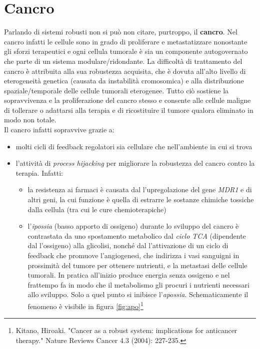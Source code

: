 \documentclass[a4paper,12pt, oneside]{book}
\begin{document}
\section{Cancro}
Parlando di sistemi robusti non si può non citare, purtroppo, il
\textbf{cancro}. Nel cancro infatti le cellule sono in grado di proliferare e
metastatizzare nonostante gli sforzi terapeutici e ogni cellula tumorale
è sia un componente autogovernato che parte di un sistema
modulare/ridondante. La difficoltà di trattamento del cancro è attribuita alla
sua robustezza acquisita, che è dovuta all'alto livello di eterogeneità genetica
(causata da instabilità cromosomica) e alla distribuzione spaziale/temporale
delle cellule tumorali eterogenee. Tutto ciò sostiene la sopravvivenza e la
proliferazione del cancro stesso e consente alle cellule maligne di tollerare o
adattarsi alla terapia e di ricostituire il tumore qualora eliminato in modo non
totale. \\
Il cancro infatti sopravvive grazie a:
\begin{itemize}
  \item molti cicli di feedback regolatori sia cellulare che nell'ambiente in
  cui si trova
  \item l'attività di \textit{process hijacking} per migliorare la robustezza
  del cancro contro la terapia. Infatti:
  \begin{itemize}
    \item la resistenza ai farmaci è causata dal l'upregolazione del gene
    \textit{MDR1} e di altri geni, la cui funzione è quella di estrarre le
    sostanze chimiche tossiche dalla cellula (tra cui le cure chemioterapiche)
    \item l'\textit{ipossia} (basso apporto di ossigeno) durante lo sviluppo del
    cancro è contrastata da uno spostamento metabolico dal \textit{ciclo TCA}
    (dipendente dal l'ossigeno) alla glicolisi, nonché dal l'attivazione di un
    ciclo di feedback che promuove l'angiogenesi, che indirizza i vasi sanguigni
    in prossimità del tumore per ottenere nutrienti, e la metastasi delle
    cellule tumorali. In pratica all'inizio produce energia senza ossigeno e nel
    frattempo fa in modo che il metabolismo gli procuri i nutrienti necessari
    allo sviluppo. Solo a quel punto si inibisce
    l'\textit{apossia}. Schematicamente il fenomeno è visibile in figura 
    \ref{fig:apo}\footnote{Kitano, Hiroaki. "Cancer as a robust system:
      implications for anticancer therapy." Nature Reviews Cancer 4.3 (2004):
      227-235.} 
  \end{itemize}
\end{itemize}
\end{document}
